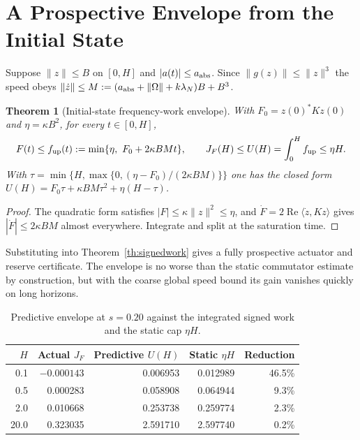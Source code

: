 \documentclass[11pt,notitlepage]{report}
\newtheorem{theorem}{Theorem}[chapter]
\theoremstyle{definition}
\theoremstyle{remark}
\newcommand{\re}{\operatorname{Re}}
\begin{document}
\section{A Prospective Envelope from the Initial State}
Suppose $\|z\|\le B$ on $[0,H]$ and $|a(t)|\le a_{\rm abs}$. Since $\|g(z)\|\le\|z\|^3$ the speed obeys $\|\dot z\|\le M:=(a_{\rm abs}+\|\Omega\|+k\lambda_N)B+B^3$.
\begin{theorem}[Initial-state frequency-work envelope]\label{th:predictive}
With $F_0=z(0)^*Kz(0)$ and $\eta=\kappa B^2$, for every $t\in[0,H]$,
\[
F(t)\le f_{\rm up}(t):=\min\{\eta,\ F_0+2\kappa BMt\},
\qquad J_F(H)\le U(H)=\int_0^Hf_{\rm up}\le\eta H.
\]
With $\tau=\min\{H,\max\{0,(\eta-F_0)/(2\kappa BM)\}\}$ one has the closed form $U(H)=F_0\tau+\kappa BM\tau^2+\eta(H-\tau)$.
\end{theorem}
\begin{proof}
The quadratic form satisfies $|F|\le\kappa\|z\|^2\le\eta$, and $\dot F=2\re\langle\dot z,Kz\rangle$ gives $|\dot F|\le2\kappa BM$ almost everywhere. Integrate and split at the saturation time.
\end{proof}
Substituting into Theorem~\ref{th:signedwork} gives a fully prospective actuator and reserve certificate. The envelope is no worse than the static commutator estimate by construction, but with the coarse global speed bound its gain vanishes quickly on long horizons.
\begin{table}[ht]\centering\small
\caption{Predictive envelope at $s=0.20$ against the integrated signed work and the static cap $\eta H$.}
\begin{tabular}{rrrrr}\toprule
$H$&Actual $J_F$&Predictive $U(H)$&Static $\eta H$&Reduction\\\midrule
0.1&$-0.000143$&0.006953&0.012989&46.5\%\\
0.5&0.000283&0.058908&0.064944&9.3\%\\
2.0&0.010668&0.253738&0.259774&2.3\%\\
20.0&0.323035&2.591710&2.597740&0.2\%\\\bottomrule
\end{tabular}
\end{table}
\end{document}
